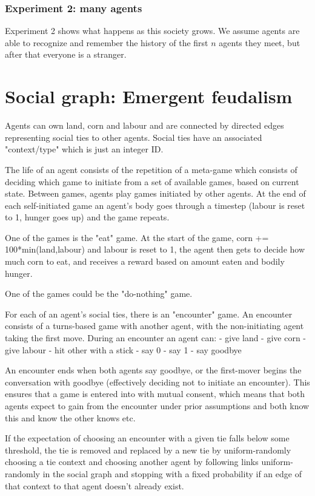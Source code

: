 \documentclass[a4paper]{report}
\begin{document}
\subsection{Experiment 2: many agents}

Experiment 2 shows what happens as this society grows. We assume agents are able to recognize and remember the history of the first $n$ agents they meet, but after that everyone is a stranger.


\chapter{Social graph: Emergent feudalism}

Agents can own land, corn and labour and are connected by directed edges representing social ties to other agents. Social ties have an associated "context/type" which is just an integer ID.

The life of an agent consists of the repetition of a meta-game which consists of deciding which game to initiate from a set of available games, based on current state. Between games, agents play games initiated by other agents. At the end of each self-initiated game an agent's body goes through a timestep (labour is reset to 1, hunger goes up) and the game repeats.

One of the games is the "eat" game. At the start of the game, corn += 100*min(land,labour) and labour is reset to 1, the agent then gets to decide how much corn to eat, and receives a reward based on amount eaten and bodily hunger.

One of the games could be the "do-nothing" game.

For each of an agent's social ties, there is an "encounter" game. An encounter consists of a turns-based game with another agent, with the non-initiating agent taking the first move. During an encounter an agent can:
- give land
- give corn
- give labour
- hit other with a stick
- say 0
- say 1
- say goodbye

An encounter ends when both agents say goodbye, or the first-mover begins the conversation with goodbye (effectively deciding not to initiate an encounter). This ensures that a game is entered into with mutual consent, which means that both agents expect to gain from the encounter under prior assumptions and both know this and know the other knows etc.

If the expectation of choosing an encounter with a given tie falls below some threshold, the tie is removed and replaced by a new tie by uniform-randomly choosing a tie context and choosing another agent by following links uniform-randomly in the social graph and stopping with a fixed probability if an edge of that context to that agent doesn't already exist.
\end{document}
